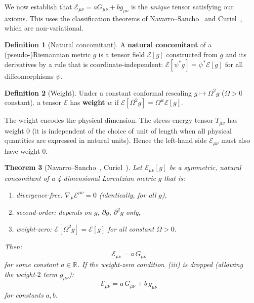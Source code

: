 \documentclass[12pt]{article}
\theoremstyle{plain}
\newtheorem{theorem}{Theorem}[section]
\theoremstyle{definition}
\newtheorem{definition}[theorem]{Definition}
\theoremstyle{remark}
\begin{document}
We now establish that $\mathcal{E}_{\mu\nu} = aG_{\mu\nu} + bg_{\mu\nu}$ is the \emph{unique} tensor satisfying our axioms. This uses the classification theorems of Navarro--Sancho~\cite{navarro2008} and Curiel~\cite{curiel2016}, which are non-variational.

\begin{definition}[Natural concomitant]\label{def:concomitant}
A \textbf{natural concomitant} of a (pseudo-)Riemannian metric $g$ is a tensor field $\mathcal{E}[g]$ constructed from $g$ and its derivatives by a rule that is coordinate-independent: $\mathcal{E}[\psi^*g] = \psi^*\mathcal{E}[g]$ for all diffeomorphisms $\psi$.
\end{definition}

\begin{definition}[Weight]\label{def:weight}
Under a constant conformal rescaling $g \mapsto \Omega^2 g$ ($\Omega > 0$ constant), a tensor $\mathcal{E}$ has \textbf{weight} $w$ if $\mathcal{E}[\Omega^2 g] = \Omega^w\mathcal{E}[g]$.
\end{definition}

The weight encodes the physical dimension. The stress-energy tensor $T_{\mu\nu}$ has weight $0$ (it is independent of the choice of unit of length when all physical quantities are expressed in natural units). Hence the left-hand side $\mathcal{E}_{\mu\nu}$ must also have weight $0$.

\begin{theorem}[Navarro--Sancho~\cite{navarro2008}, Curiel~\cite{curiel2016}]\label{thm:uniqueness}
Let $\mathcal{E}_{\mu\nu}[g]$ be a symmetric, natural concomitant of a 4-dimensional Lorentzian metric $g$ that is:
\begin{enumerate}[label=(\roman*)]
    \item divergence-free: $\nabla_\mu\mathcal{E}^{\mu\nu} = 0$ (identically, for all $g$),
    \item second-order: depends on $g$, $\partial g$, $\partial^2 g$ only,
    \item weight-zero: $\mathcal{E}[\Omega^2 g] = \mathcal{E}[g]$ for all constant $\Omega > 0$.
\end{enumerate}
Then:
\begin{equation}\label{eq:uniqueness}
\mathcal{E}_{\mu\nu} = a\,G_{\mu\nu}
\end{equation}
for some constant $a \in \mathbb{R}$. If the weight-zero condition~(iii) is dropped (allowing the weight-$2$ term $g_{\mu\nu}$):
\begin{equation}
\mathcal{E}_{\mu\nu} = a\,G_{\mu\nu} + b\,g_{\mu\nu}
\end{equation}
for constants $a, b$.
\end{theorem}
\end{document}
